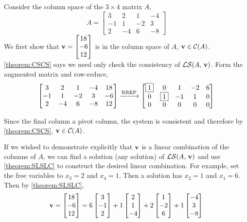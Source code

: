 \documentclass{ximera}
\begin{document}
\begin{example}
  Consider the column space of the $3\times 4$ matrix $A$,
  \[
    A=
    \begin{bmatrix}
      3 & 2 & 1 & -4\\
      -1 & 1 & -2 & 3\\
      2 & -4 & 6 & -8
    \end{bmatrix}
  \]
  We first show that $\mathbf{v}=\begin{bmatrix}18\\-6\\12\end{bmatrix}$ is in the
  column space of $A$, $\mathbf{v}\in\mathcal{C}\!\left(A\right)$.  \ref{theorem:CSCS} says
  we need only check the consistency of $\mathcal{LS}\!\left(A,\,\mathbf{v}\right)$.
  Form the augmented matrix and row-reduce,
  \[
    \begin{bmatrix}
      3 & 2 & 1 & -4 & 18\\
      -1 & 1 & -2 & 3 & -6\\
      2 & -4 & 6 & -8 & 12
    \end{bmatrix}
    \xrightarrow{\text{RREF}}
    \begin{bmatrix}
      \fbox{1} & 0 & 1 & -2 & 6\\
      0 & \fbox{1} & -1 & 1 & 0\\
      0 & 0 & 0 & 0 & 0
    \end{bmatrix}
  \]
  
  Since the final column  a pivot column, the system is consistent and
  therefore by \ref{theorem:CSCS}, $\mathbf{v}\in\mathcal{C}\!\left(A\right)$.

  If we wished to demonstrate explicitly that $\mathbf{v}$ is a linear
  combination of the columns of $A$, we can find a solution (any
  solution) of $\mathcal{LS}\!\left(A,\,\mathbf{v}\right)$ and use
  \ref{theorem:SLSLC} to construct the desired linear combination.
  For example, set the free variables to $x_3=2$ and $x_4=1$.  Then a
  solution has $x_2=1$ and $x_1=6$.  Then by \ref{theorem:SLSLC},
  \[
    \mathbf{v}=\begin{bmatrix}18\\-6\\12\end{bmatrix}=
    6\begin{bmatrix}3\\-1\\2\end{bmatrix}+
    1\begin{bmatrix}2\\1\\-4\end{bmatrix}+
    2\begin{bmatrix}1\\-2\\6\end{bmatrix}+
    1\begin{bmatrix}-4\\3\\-8\end{bmatrix}
  \]


\end{example}
\end{document}
